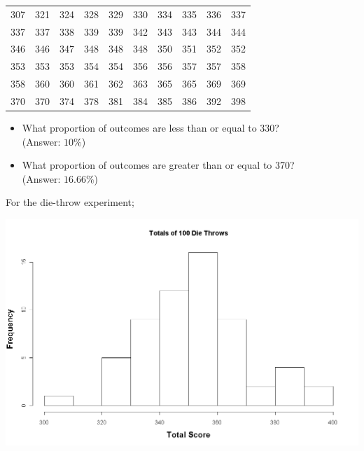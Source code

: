 \documentclass[12pt]{report}
\begin{document}
	
	\small
	\begin{center}
		\begin{tabular}{|c c c c c c c c c c|}
			\hline
			307 & 321 & 324 & 328 & 329 & 330 & 334 & 335 & 336 &337 \\
			337 & 337 & 338 & 339 & 339 & 342 & 343 & 343 & 344 &344 \\
			346 & 346 & 347 & 348 & 348 & 348 & 350 & 351 & 352 &352 \\
			353 & 353 & 353 & 354 & 354 & 356 & 356 & 357 & 357 &358 \\
			358 & 360 & 360 & 361 & 362 & 363 & 365 & 365 & 369 &369 \\
			370 & 370 & 374 & 378 & 381 & 384 & 385 & 386 & 392 &398 \\
			\hline
		\end{tabular}
	\end{center}
	\normalsize
	\begin{itemize}
		\item What proportion of outcomes are less than or equal to 330? \\ (Answer: $10\%$)
		\item What proportion of outcomes are greater than or equal to 370?\\ (Answer: $16.66\%$)
	\end{itemize}
	
	For the die-throw experiment;
	\begin{center}
		\includegraphics[scale=0.30]{images/3aDieHist}
	\end{center}
	
\end{document}
